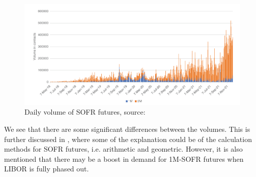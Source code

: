 \begin{figure}[htp]
    \centering
    \includegraphics[width=14cm]{figures/SOFR/SOFR_future_volume.PNG}
    \caption{Daily volume of SOFR futures, source: \cite{huggins2022sofr} }
    \label{fig: Volume_SOFR_futures}
\end{figure}

We see that there are some significant differences between the volumes. This is further discussed in \cite{huggins2022sofr}, where some of the explanation could be of the calculation methods for SOFR futures, i.e. arithmetic and geometric. However, it is also mentioned that there may be a boost in demand for 1M-SOFR futures when LIBOR is fully phased out. 









\newpage 

